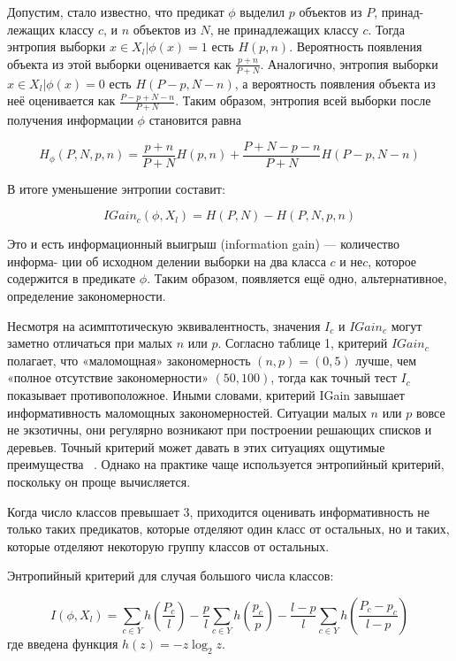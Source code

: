 Допустим, стало известно, что предикат $\phi$ выделил $p$ объектов из $P$, принад-
лежащих классу $c$, и $n$ объектов из $N$, не принадлежащих классу $c$. Тогда энтропия выборки ${x\in X_l|\phi(x)=1}$ есть $H(p,n)$. Вероятность появления объекта из этой выборки оценивается как $\frac{p+n}{P+N}$. Аналогично, энтропия выборки ${x\in X_l|\phi(x)=0}$ есть $H(P-p,N-n)$, а вероятность появления объекта из неё оценивается как $\frac{P-p+N-n}{P+N}$. Таким образом, энтропия всей выборки после получения информации $\phi$ становится равна

\begin{equation}
	H_{\phi}(P,N,p,n)=\frac{p+n}{P+N}H(p,n) + \frac{P+N-p-n}{P+N}H(P-p,N-n)
\end{equation}

В итоге уменьшение энтропии составит:

\begin{equation}
	{IGain}_c(\phi,X_l)=H(P,N)-H(P,N,p,n)
\end{equation}

Это и есть информационный выигрыш (information gain) — количество информа-
ции об исходном делении выборки на два класса $c$ и $не c$, которое содержится
в предикате $\phi$. Таким образом, появляется ещё одно, альтернативное, определение
закономерности.

Несмотря на асимптотическую эквивалентность, значения $I_c$ и ${IGain}_c$ могут заметно отличаться при малых $n$ или $p$. Согласно таблице 1, критерий ${IGain}_c$ полагает, что «маломощная» закономерность $(n,p)=(0,5)$ лучше, чем «полное отсутствие закономерности» $(50,100)$, тогда как точный тест $I_c$ показывает противоположное. Иными словами, критерий IGain завышает информативность маломощных закономерностей. Ситуации малых $n$ или $p$ вовсе не экзотичны, они регулярно возникают при построении решающих списков и деревьев. Точный критерий может давать в этих ситуациях ощутимые преимущества ~\cite{martin}. Однако на практике чаще используется энтропийный критерий, поскольку он проще вычисляется.

Когда число классов превышает 3, приходится оценивать информативность не только таких предикатов, которые отделяют один класс от остальных, но и таких, которые отделяют некоторую группу классов от остальных.

Энтропийный критерий для случая большого числа классов:

\begin{equation}
	I(\phi,X_l)=\sum_{c\in Y}h(\frac{P_c}{l})-\frac{p}{l}\sum_{c\in Y}h(\frac{p_c}{p})-\frac{l-p}{l}\sum_{c\in Y}h(\frac{P_c-p_c}{l-p})
\end{equation}
где введена функция $h(z)=-z\log_2 z$.

